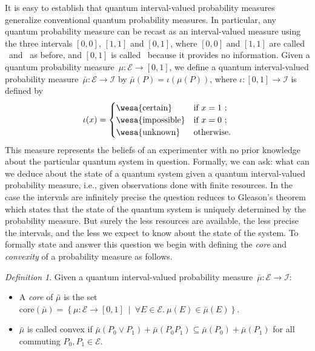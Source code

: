 \documentclass{article}
\theoremstyle{remark}
\newtheorem{definition}{Definition}
\newcommand{\events}{\ensuremath{\mathcal{E}}}
\newcommand{\pmeas}{\ensuremath{\mu}}
\newcommand{\imposs}{{\mbox{\wesa{impossible}}}}
\newcommand{\necess}{{\mbox{\wesa{certain}}}}
\newcommand{\unknown}{{\mbox{\wesa{unknown}}}}
\begin{document}
\noindent It is easy to establish that quantum interval-valued
probability measures generalize conventional quantum probability
measures. In particular, any quantum probability measure can be recast
as an interval-valued measure using the three intervals
$\left[0,0\right]$, $\left[1,1\right]$ and \emph{$\left[0,1\right]$},
where $\left[0,0\right]$ and $\left[1,1\right]$ are called \imposs~and
\necess~as before, and \emph{$\left[0,1\right]$} is called
\unknown~because it provides no information. Given a quantum
probability measure~$\mu:\events\rightarrow\left[0,1\right]$, we
define a quantum interval-valued probability
measure~$\bar{\mu}:\events\rightarrow\mathscr{I}$ by
$\bar{\mu}(P)=\iota\left(\mu(P)\right)$, where
$\iota:\left[0,1\right]\rightarrow\mathscr{I}$ is defined by
\[
\iota(x)=\begin{cases}
\necess & \textrm{if }x=1\textrm{ ;}\\
\imposs & \textrm{if }x=0\textrm{ ;}\\
\unknown & \textrm{otherwise.}
\end{cases}
\]
This measure represents the beliefs of an experimenter with no prior 
knowledge about the particular quantum system in question. Formally,
we can ask: what can we deduce about the state of a quantum system
given a quantum interval-valued probability measure, i.e., given
observations done with finite resources. In the case the intervals are
infinitely precise the question reduces to Gleason's theorem which
states that the state of the quantum system is uniquely determined by
the probability measure. But surely the less resources are available,
the less precise the intervals, and the less we expect to know about
the state of the system. To formally state and answer this question we
begin with defining the \emph{core} and \emph{convexity} of a
probability measure as follows.

\begin{definition}
  Given a quantum interval-valued probability
  measure~$\bar{\mu}:\events\rightarrow\mathscr{I}$:
\begin{itemize}
\item A \emph{core} of $\bar{\mu}$ is the set
  $\mathrm{core}\left(\bar{\mu}\right)=\left\{
    \pmeas:\events\rightarrow[0,1] ~\middle|~ \forall
    E\in\events.~\pmeas\left(E\right)\in\bar{\mu}\left(E\right)\right\}$.
\item $\bar{\mu}$ is called convex if
  $\bar{\mu}\left(P_{0}\vee
    P_{1}\right)+\bar{\mu}\left(P_{0}P_{1}\right)\subseteq\bar{\mu}\left(P_{0}\right)+\bar{\mu}\left(P_{1}\right)$
  for all commuting $P_{0},P_{1}\in\events$.
\end{itemize}
\end{definition}
\end{document}
